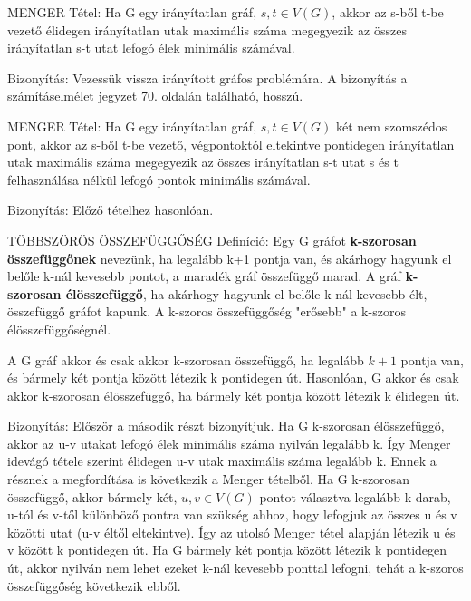 \begin{framed}
MENGER Tétel: Ha G egy irányítatlan gráf, $s,t\in V(G)$, akkor az s-ből t-be vezető élidegen irányítatlan utak maximális száma megegyezik az összes irányítatlan s-t utat lefogó élek minimális számával.
\end{framed}
\begin{leftbar}
Bizonyítás: Vezessük vissza irányított gráfos problémára. A bizonyítás a számításelmélet jegyzet 70. oldalán található, hosszú.
\end{leftbar}
\begin{framed}
MENGER Tétel: Ha G egy irányítatlan gráf, $s,t\in V(G)$ két nem szomszédos pont, akkor az s-ből t-be vezető, végpontoktól eltekintve pontidegen irányítatlan utak maximális száma megegyezik az összes irányítatlan s-t utat s és t felhasználása nélkül lefogó pontok minimális számával.
\end{framed}
\begin{leftbar}
Bizonyítás: Előző tételhez hasonlóan.
\end{leftbar}
\begin{shaded}
TÖBBSZÖRÖS ÖSSZEFÜGGŐSÉG Definíció: Egy G gráfot \textbf{k-szorosan összefüggőnek} nevezünk, ha legalább k+1 pontja van, és akárhogy hagyunk el belőle k-nál kevesebb pontot, a maradék gráf összefüggő marad. A gráf \textbf{k-szorosan élösszefüggő}, ha akárhogy hagyunk el belőle k-nál kevesebb élt, összefüggő gráfot kapunk. A k-szoros összefüggőség "erősebb" a k-szoros élösszefüggőségnél.
\end{shaded}
\begin{framed}
A G gráf akkor és csak akkor k-szorosan összefüggő, ha legalább $k + 1$ pontja van, és bármely két pontja között létezik k pontidegen út. Hasonlóan, G akkor és csak akkor k-szorosan élösszefüggő, ha bármely két pontja között létezik k élidegen út.
\end{framed}
\begin{leftbar}
Bizonyítás: Először a második részt bizonyítjuk. Ha G k-szorosan élösszefüggő, akkor az u-v utakat lefogó élek minimális száma nyilván legalább k. Így Menger idevágó tétele szerint élidegen u-v utak maximális száma legalább k. Ennek a résznek a megfordítása is következik a Menger tételből. Ha G k-szorosan összefüggő, akkor bármely két, $u,v\in V(G)$ pontot választva legalább k darab, u-tól és v-től különböző pontra van szükség ahhoz, hogy lefogjuk az összes u és v közötti utat (u-v éltől eltekintve). Így az utolsó Menger tétel alapján létezik u és v között k pontidegen út. Ha G bármely két pontja között létezik k pontidegen út, akkor nyilván nem lehet ezeket k-nál kevesebb ponttal lefogni, tehát a k-szoros összefüggőség következik ebből.
\end{leftbar}
